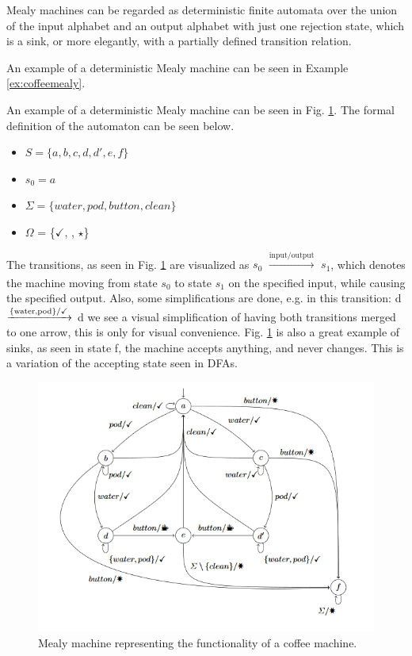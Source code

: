 Mealy machines can be regarded as deterministic finite automata over the union of the input alphabet and an output alphabet with just one rejection state, which is a sink, or more elegantly, with a partially defined transition relation. 

An example of a deterministic Mealy machine can be seen in Example \ref{ex:coffeemealy}.

\begin{example}
	\label{ex:coffeemealy}
	An example of a deterministic Mealy machine can be seen in Fig. \ref{fig:coffeemealy}. The formal definition of the automaton can be seen below.
	\begin{itemize} 
		\item $S = \{a, b, c, d, d', e, f\}$ 
		\item $s_0 = a$
		\item $\Sigma = \{water, pod, button, clean\}$
		\item $\Omega$ = \{$\checkmark$, \Coffeecup, $\star$\}
	\end{itemize}
	The transitions, as seen in Fig. \ref{fig:coffeemealy} are visualized as $s_0$ $\xrightarrow[]{\text{input/output}}$ $s_1$, which denotes the machine moving from state $s_0$ to state $s_1$ on the specified input, while causing the specified output. Also, some simplifications are done, e.g. in this transition: d $\xrightarrow[]{\text{\{water,pod\}/\checkmark}}$ d we see a visual simplification of having both transitions merged to one arrow, this is only for visual convenience. Fig. \ref{fig:coffeemealy} is also a great example of sinks, as seen in state f, the machine accepts anything, and never changes. This is a variation of the accepting state seen in DFAs.
\end{example}

\begin{figure}[H]
	\centering
	\includegraphics[width=0.7\linewidth]{content/coffeemealy}
	\caption{Mealy machine representing the functionality of a coffee machine.\cite{Steffen2011}}
	\label{fig:coffeemealy}
\end{figure}

